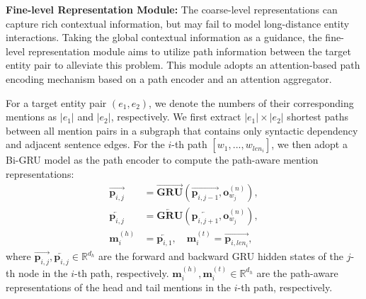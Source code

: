 \documentclass{article}
\begin{document}
\noindent\textbf{Fine-level Representation Module:} 
The coarse-level representations can capture rich contextual information, but may fail to model long-distance entity interactions. 
Taking the global contextual information as a guidance, the fine-level representation module aims to utilize path information between the target entity pair to alleviate this problem. 
This module adopts an attention-based path encoding mechanism based on a path encoder and an attention aggregator. 

For a target entity pair $(e_1, e_2)$, we denote the numbers of their corresponding mentions as $\left|e_1\right|$ and $\left|e_2\right|$, respectively. 
We first extract $\left|e_1\right| \times \left|e_2\right|$ shortest paths between all mention pairs in a subgraph that contains only syntactic dependency and adjacent sentence edges. 
For the $i$-th path $[w_1, ..., w_{{len}_i}]$,  we then adopt a Bi-GRU model as the path encoder to compute the path-aware mention representations: 
\begin{align}
    \overrightarrow{\mathbf{p}_{i, j}} &= \overrightarrow{\mathbf{GRU}} \left( \overrightarrow{\mathbf{p}_{i, j-1}}, \mathbf{o}^{(n)}_{w_j} \right), \\
    \overleftarrow{\mathbf{p}_{i, j}} &= \overleftarrow{\mathbf{GRU}} \left( \overleftarrow{\mathbf{p}_{i, j+1}}, \mathbf{o}^{(n)}_{w_j} \right), \\
    \mathbf{m}^{(h)}_{i} &= \overleftarrow{\mathbf{p}_{i, 1}}, \quad
    \mathbf{m}^{(t)}_{i} = \overrightarrow{\mathbf{p}_{i, {len}_i}}, 
\end{align}
where $\overrightarrow{\mathbf{p}_{i, j}}, \overleftarrow{\mathbf{p}_{i, j}} \in \mathbb{R}^{d_h}$ are the forward and backward GRU hidden states of the $j$-th node in the $i$-th path, respectively. 
$\mathbf{m}^{(h)}_{i}, \mathbf{m}^{(t)}_{i} \in \mathbb{R}^{d_h}$ are the path-aware representations of the head and tail mentions in the $i$-th path, respectively. 
\end{document}
